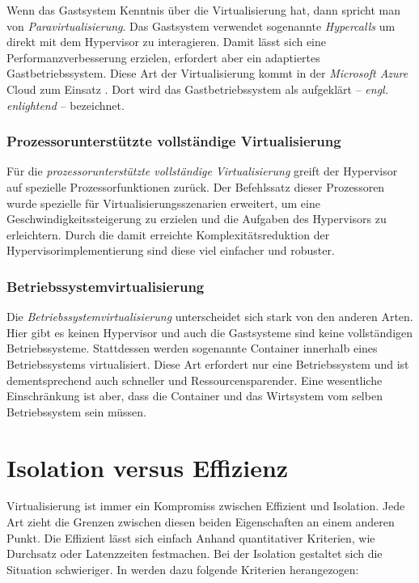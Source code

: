 Wenn das Gastsystem Kenntnis über die Virtualisierung hat, dann spricht man von \textit{Paravirtualisierung}. Das Gastsystem verwendet sogenannte \textit{Hypercalls} um direkt mit dem Hypervisor zu interagieren. Damit lässt sich eine Performanzverbesserung erzielen, erfordert aber ein adaptiertes Gastbetriebssystem. Diese Art der Virtualisierung kommt \zB in der \textit{Microsoft Azure} Cloud zum Einsatz \cite[30]{Krishnan10}. Dort wird das Gastbetriebssystem als aufgeklärt -- \textit{engl. enlightend} -- bezeichnet.

\subsubsection{Prozessorunterstützte vollständige Virtualisierung}

Für die \textit{prozessorunterstützte vollständige Virtualisierung} greift der Hypervisor auf spezielle Prozessorfunktionen zurück. Der Befehlssatz dieser Prozessoren wurde spezielle für Virtualisierungsszenarien erweitert, um eine Geschwindigkeitssteigerung zu erzielen und die Aufgaben des Hypervisors zu erleichtern. Durch die damit erreichte Komplexitätsreduktion der Hypervisorimplementierung sind diese viel einfacher und robuster.

\subsubsection{Betriebssystemvirtualisierung}

Die \textit{Betriebssystemvirtualisierung} unterscheidet sich stark von den anderen Arten. Hier gibt es keinen Hypervisor und auch die Gastsysteme sind keine vollständigen Betriebssysteme. Stattdessen werden sogenannte Container innerhalb eines Betriebssystems virtualisiert. Diese Art erfordert nur eine Betriebssystem und ist dementsprechend auch schneller und Ressourcensparender. Eine wesentliche Einschränkung ist aber, dass die Container und das Wirtsystem vom selben Betriebssystem sein müssen.

\section{Isolation versus Effizienz}
\label{sec:isolation-vs-efficiencys}

Virtualisierung ist immer ein Kompromiss zwischen Effizient und Isolation. Jede Art zieht die Grenzen zwischen diesen beiden Eigenschaften an einem anderen Punkt. Die Effizient lässt sich einfach Anhand quantitativer Kriterien, wie Durchsatz oder Latenzzeiten festmachen. Bei der Isolation gestaltet sich die Situation schwieriger. In \cite{Soltesz:2007:COS:1272996.1273025} werden dazu folgende Kriterien herangezogen:

